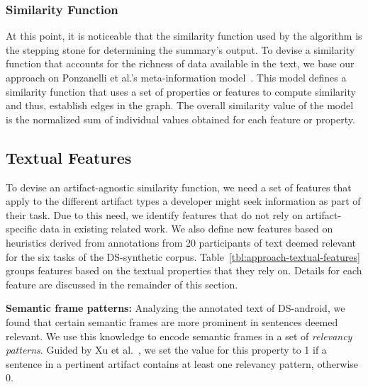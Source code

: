 \subsubsection{Similarity Function}


At this point, it is noticeable that the similarity function used by the algorithm is the stepping stone for determining the summary's output.  
To devise a similarity function that accounts for the richness of data available in the text, we base our approach on Ponzanelli et al.'s meta-information model~\cite{Ponzanelli2015}.
This model defines a similarity function that uses a set of properties or features to compute similarity and thus, establish edges in the graph.
The overall similarity value of the model is the normalized sum of individual values obtained for each feature or property.



\subsection{Textual Features}



To devise an artifact-agnostic similarity function, we need a set of features that apply to the different artifact types a developer might seek information as part of their task.
Due to this need, we identify features that do not rely on artifact-specific data in existing related work. 
We also define new features based 
on heuristics derived from annotations from 20 participants of text deemed relevant
for the six tasks of the \acs{DS-synthetic} corpus.
Table~\ref{tbl:approach-textual-features} groups features based on the textual properties that they rely on. Details for each feature are discussed in the remainder of this section.




\vspace{3mm}
\begin{hangparas}{1em}{1}
    \textbf{Semantic frame patterns:} Analyzing the annotated text of \acs{DS-android}, 
    we found that certain semantic frames are more prominent in sentences deemed relevant.
    We use this knowledge to encode semantic frames in a set of \textit{relevancy patterns}. 
    Guided by Xu et al.~\cite{Xu2017}, we set the value for this property to 1 if a sentence in a pertinent artifact contains at least one relevancy pattern, otherwise 0.
\end{hangparas}


